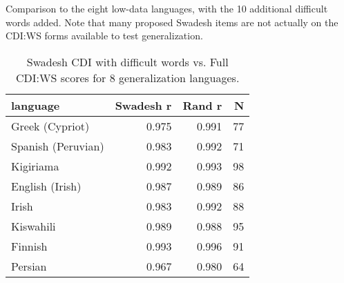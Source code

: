 \documentclass[
]{article}
\begin{document}
Comparison to the eight low-data languages, with the 10 additional
difficult words added. Note that many proposed Swadesh items are not
actually on the CDI:WS forms available to test generalization.

\begin{table}[H]
\centering
\begin{tabular}{lrrr}
  \hline
language & Swadesh r & Rand r & N \\ 
  \hline
Greek (Cypriot) & 0.975 & 0.991 &   77 \\ 
  Spanish (Peruvian) & 0.983 & 0.992 &   71 \\ 
  Kigiriama & 0.992 & 0.993 &   98 \\ 
  English (Irish) & 0.987 & 0.989 &   86 \\ 
  Irish & 0.983 & 0.992 &   88 \\ 
  Kiswahili & 0.989 & 0.988 &   95 \\ 
  Finnish & 0.993 & 0.996 &   91 \\ 
  Persian & 0.967 & 0.980 &   64 \\ 
   \hline
\end{tabular}
\caption{Swadesh CDI with difficult words vs. Full CDI:WS scores for 8 generalization languages.} 
\end{table}
\end{document}
